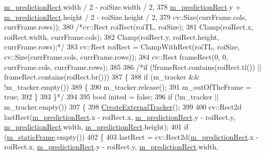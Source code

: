 \begin{DoxyCode}
      \mbox{\hyperlink{class_c_track_aeab9c3c95a6d988918f5874a8910b90b}{m\_predictionRect}}.width / 2 - roiSize.width / 2,
378                                                    \mbox{\hyperlink{class_c_track_aeab9c3c95a6d988918f5874a8910b90b}{m\_predictionRect}}.y + 
      \mbox{\hyperlink{class_c_track_aeab9c3c95a6d988918f5874a8910b90b}{m\_predictionRect}}.height / 2 - roiSize.height / 2,
379                                                    cv::Size(currFrame.cols, currFrame.rows));
380             \textcolor{comment}{/*cv::Rect roiRect(roiTL, roiSize);}
381 \textcolor{comment}{            Clamp(roiRect.x, roiRect.width, currFrame.cols);}
382 \textcolor{comment}{            Clamp(roiRect.y, roiRect.height, currFrame.rows);*/}
383             cv::Rect roiRect = ClampWithRect(roiTL, roiSize, cv::Size(currFrame.cols, currFrame.rows));
384             cv::Rect frameRect(0, 0, currFrame.cols, currFrame.rows);
385 
386             \textcolor{comment}{/*if (!frameRect.contains(roiRect.tl()) || frameRect.contains(roiRect.br()))}
387 \textcolor{comment}{            \{}
388 \textcolor{comment}{                if (m\_tracker && !m\_tracker.empty())}
389 \textcolor{comment}{                \{}
390 \textcolor{comment}{                    m\_tracker.release();}
391 \textcolor{comment}{                    m\_outOfTheFrame = true;}
392 \textcolor{comment}{                \}}
393 \textcolor{comment}{            \}*/}
394 
395             \textcolor{keywordtype}{bool} inited = \textcolor{keyword}{false};
396             \textcolor{keywordflow}{if} (!m\_tracker || m\_tracker.empty())
397             \{
398                 \mbox{\hyperlink{class_c_track_ab7ffab3c66234eeb542d0411abfa24e6}{CreateExternalTracker}}();
399 
400                 cv::Rect2d lastRect(\mbox{\hyperlink{class_c_track_aeab9c3c95a6d988918f5874a8910b90b}{m\_predictionRect}}.x - roiRect.x, 
      \mbox{\hyperlink{class_c_track_aeab9c3c95a6d988918f5874a8910b90b}{m\_predictionRect}}.y - roiRect.y, \mbox{\hyperlink{class_c_track_aeab9c3c95a6d988918f5874a8910b90b}{m\_predictionRect}}.width, 
      \mbox{\hyperlink{class_c_track_aeab9c3c95a6d988918f5874a8910b90b}{m\_predictionRect}}.height);
401                 \textcolor{keywordflow}{if} (\mbox{\hyperlink{class_c_track_a87bfcad44f8da34b2411733ed5ddcbae}{m\_staticFrame}}.empty())
402                 \{
403                     lastRect = cv::Rect2d(\mbox{\hyperlink{class_c_track_aeab9c3c95a6d988918f5874a8910b90b}{m\_predictionRect}}.x - roiRect.x, 
      \mbox{\hyperlink{class_c_track_aeab9c3c95a6d988918f5874a8910b90b}{m\_predictionRect}}.y - roiRect.y, \mbox{\hyperlink{class_c_track_aeab9c3c95a6d988918f5874a8910b90b}{m\_predictionRect}}.width, 

\end{DoxyCode}
